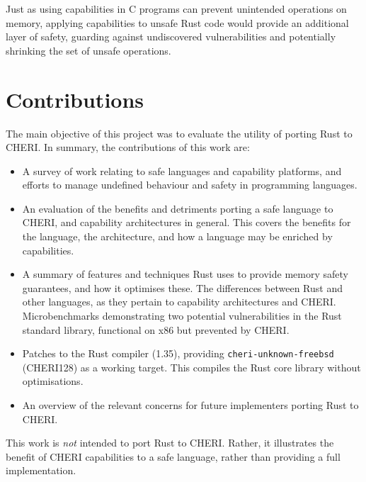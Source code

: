 \documentclass[dissertation.tex]{subfiles}
\begin{document}
Just as using capabilities in C programs can prevent unintended operations on memory, applying capabilities to unsafe Rust code would provide an additional layer of safety, guarding against undiscovered vulnerabilities and potentially shrinking the set of unsafe operations.


\section{Contributions}
\label{sec:intro-contrib}

The main objective of this project was to evaluate the utility of
porting Rust to CHERI.
In summary, the contributions of this work are:


\begin{itemize}
    \item A survey of work relating to safe languages and capability
    platforms, and efforts to manage undefined behaviour and safety in
    programming languages.
    \item An evaluation of the benefits and detriments porting a safe
    language to CHERI, and capability architectures in general.
    This covers the benefits for the language, the architecture, and how
    a language may be enriched by capabilities.
    \item A summary of features and techniques Rust uses to provide
    memory safety guarantees, and how it optimises these.
    The differences between Rust and other languages, as they pertain to
    capability architectures and CHERI.
    Microbenchmarks demonstrating two potential vulnerabilities in
    the Rust standard library, functional on x86 but prevented by CHERI.
    \item Patches to the Rust compiler (1.35), providing
    \texttt{cheri-unknown-freebsd} (CHERI128) as a working target.
    This compiles the Rust core library without optimisations.
    \item An overview of the relevant concerns for future implementers
    porting Rust to CHERI.
\end{itemize}

This work is \emph{not} intended to port Rust to CHERI.
Rather, it illustrates the benefit of CHERI capabilities to a safe
language, rather than providing a full implementation.
\end{document}
